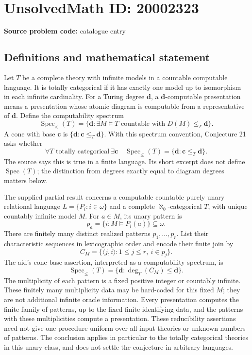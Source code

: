 \documentclass[11pt]{article}
\begin{document}
\section*{UnsolvedMath ID: 20002323}
\textbf{Source problem code:} catalogue entry
\subsection{Definitions and mathematical statement}
Let \(T\) be a complete theory with infinite models in a countable computable language. It is totally categorical if it has exactly one model up to isomorphism in each infinite cardinality. For a Turing degree \(\mathbf d\), a \(\mathbf d\)-computable presentation means a presentation whose atomic diagram is computable from a representative of \(\mathbf d\). Define the computability spectrum
\[
 \operatorname{Spec}_{\le}(T)
 =\{\mathbf d:\exists M\models T\text{ countable with }D(M)\le_T\mathbf d\}.
\]
A cone with base \(\mathbf c\) is \(\{\mathbf d:\mathbf c\le_T\mathbf d\}\). With this spectrum convention, Conjecture 21 asks whether
\[
 \forall T\text{ totally categorical}\ \exists\mathbf c\quad
 \operatorname{Spec}_{\le}(T)=\{\mathbf d:\mathbf c\le_T\mathbf d\}.
\]
The source says this is true in a finite language. Its short excerpt does not define \(\operatorname{Spec}(T)\); the distinction from degrees exactly equal to diagram degrees matters below.

The supplied partial result concerns a computable countable purely unary relational language \(L=\{P_i:i\in\omega\}\) and a complete \(\aleph_0\)-categorical \(T\), with unique countably infinite model \(M\). For \(a\in M\), its unary pattern is
\[
 p_a=\{i:M\models P_i(a)\}\subseteq\omega.
\]
There are finitely many distinct realized patterns \(p_1,\ldots,p_r\). List their characteristic sequences in lexicographic order and encode their finite join by
\[
 C_M=\{\langle j,i\rangle:1\le j\le r,\ i\in p_j\}.
\]
The aid's cone-base assertion, interpreted as a computability spectrum, is
\[
 \operatorname{Spec}_{\le}(T)
 =\{\mathbf d:\deg_T(C_M)\le\mathbf d\}.
\]
The multiplicity of each pattern is a fixed positive integer or countably infinite. These finitely many multiplicity data may be hard-coded for this fixed \(M\); they are not additional infinite oracle information. Every presentation computes the finite family of patterns, up to the fixed finite identifying data, and the patterns with these multiplicities compute a presentation. These reducibility assertions need not give one procedure uniform over all input theories or unknown numbers of patterns. The conclusion applies in particular to the totally categorical theories in this unary class, and does not settle the conjecture in arbitrary languages.
\end{document}
